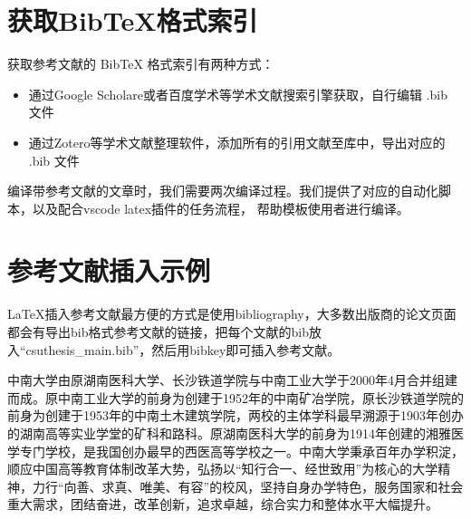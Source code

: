 \section{获取BibTeX格式索引}

获取参考文献的 BibTeX 格式索引有两种方式：

\begin{itemize}
    \item 通过Google Scholare或者百度学术等学术文献搜索引擎获取，自行编辑 .bib 文件
    \item 通过Zotero等学术文献整理软件，添加所有的引用文献至库中，导出对应的 .bib 文件
\end{itemize}

编译带参考文献的文章时，我们需要两次编译过程。我们提供了对应的自动化脚本，以及配合vscode latex插件的任务流程，
帮助模板使用者进行编译。

\section{参考文献插入示例}

LaTeX\cite{lamport1994latex}插入参考文献最方便的方式是使用bibliography\cite{pritchard1969statistical}，大多数出版商的论文页面\cite{lamport1994latex,pritchard1969statistical}都会有导出bib格式参考文献的链接，把每个文献的bib放入``csuthesis\_main.bib''，然后用bibkey即可插入参考文献。

中南大学由原湖南医科大学、长沙铁道学院与中南工业大学于2000年4月合并组建而成。原中南工业大学的前身为创建于1952年的中南矿冶学院，原长沙铁道学院的前身为创建于1953年的中南土木建筑学院，两校的主体学科最早溯源于1903年创办的湖南高等实业学堂的矿科和路科。原湖南医科大学的前身为1914年创建的湘雅医学专门学校，是我国创办最早的西医高等学校之一。中南大学秉承百年办学积淀，顺应中国高等教育体制改革大势，弘扬以“知行合一、经世致用”为核心的大学精神，力行“向善、求真、唯美、有容”的校风，坚持自身办学特色，服务国家和社会重大需求，团结奋进，改革创新，追求卓越，综合实力和整体水平大幅提升。


\newpage


